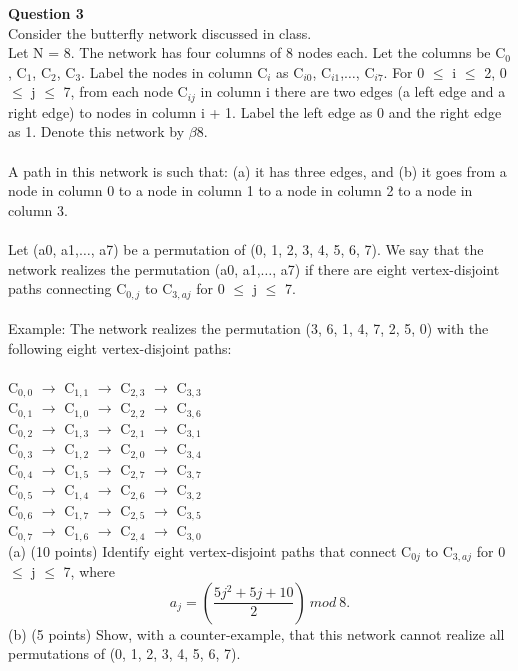 \documentclass[11pt]{article}
\begin{document}
\textbf{Question 3}\\
Consider the butterfly network discussed in class.\\
Let N = 8. The network has four columns of 8 nodes each. Let the columns be C$_0$, C$_1$, C$_2$, C$_3$. Label
the nodes in column C$_{i}$ as C$_{i0}$, C$_{i1}$,$\dots$, C$_{i7}$. For 0 $\leq$ i $\leq$ 2, 0 $\leq$ j $\leq$ 7, from each node C$_{ij}$ in
column i there are two edges (a left edge and a right edge) to nodes in column i + 1. Label the left
edge as 0 and the right edge as 1. Denote this network by $\beta8$.\\ \\
A path in this network is such that: (a) it has three edges, and (b) it goes from a node in column 0 to
a node in column 1 to a node in column 2 to a node in column 3.\\ \\
Let (a0, a1,$\dots$, a7) be a permutation of (0, 1, 2, 3, 4, 5, 6, 7). We say that the network realizes the permutation (a0, a1,$\dots$, a7) if there are eight vertex-disjoint paths connecting C$_{0,j}$ to C$_{3,aj}$
for 0 $\leq$ j $\leq$ 7.\\ \\
Example: The network realizes the permutation (3, 6, 1, 4, 7, 2, 5, 0) with the following eight vertex-disjoint paths:\\ \\
C$_{0,0}$ $\to$ C$_{1,1}$ $\to$ C$_{2,3}$  $\to$ C$_{3,3}$ \\
C$_{0,1}$ $\to$ C$_{1,0}$ $\to$ C$_{2,2}$  $\to$ C$_{3,6}$ \\
C$_{0,2}$ $\to$ C$_{1,3}$ $\to$ C$_{2,1}$  $\to$ C$_{3,1}$ \\
C$_{0,3}$ $\to$ C$_{1,2}$ $\to$ C$_{2,0}$  $\to$ C$_{3,4}$ \\
C$_{0,4}$ $\to$ C$_{1,5}$ $\to$ C$_{2,7}$  $\to$ C$_{3,7}$ \\
C$_{0,5}$ $\to$ C$_{1,4}$ $\to$ C$_{2,6}$  $\to$ C$_{3,2}$ \\
C$_{0,6}$ $\to$ C$_{1,7}$ $\to$ C$_{2,5}$  $\to$ C$_{3,5}$ \\
C$_{0,7}$ $\to$ C$_{1,6}$ $\to$ C$_{2,4}$  $\to$ C$_{3,0}$ \\
(a) (10 points) Identify eight vertex-disjoint paths that connect C$_{0j}$ to C$_{3,aj}$
for 0 $\leq$ j $\leq$ 7, where
\begin{equation}
a_j = ( \frac{5j^2+ 5j + 10}{2})\ mod\ 8.
\end{equation}
(b) (5 points) Show, with a counter-example, that this network cannot realize all permutations of
(0, 1, 2, 3, 4, 5, 6, 7).
\end{document}
